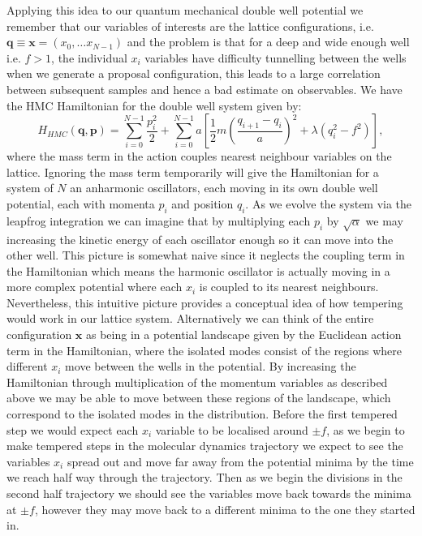 \documentclass[12pt]{article}
\begin{document}
    Applying this idea to our quantum mechanical double well potential we remember that our variables of interests are the lattice configurations, i.e. $\bm{q}\equiv\bm{x}=\left(x_0,\dots x_{N-1}\right)$ and the problem is that for a deep and wide enough well i.e. $f>1$, the individual $x_i$ variables have difficulty tunnelling between the wells when we generate a proposal configuration, this leads to a large correlation between subsequent samples and hence a bad estimate on observables. We have the HMC Hamiltonian for the double well system given by:
    \begin{equation}
        H_{HMC}\left(\bm{q},\bm{p}\right) = \sum_{i=0}^{N-1}\frac{p_i^2}{2} + \sum_{i=0}^{N-1} a \left[\frac{1}{2}m\left(\frac{q_{i+1}-q_{i}}{a}\right)^2 + \lambda\left(q_i^2-f^2\right)\right],
    \end{equation}
    where the mass term in the action couples nearest neighbour variables on the lattice. Ignoring the mass term temporarily will give the Hamiltonian for a system of $N$ an anharmonic oscillators, each moving in its own double well potential, each with momenta $p_i$ and position $q_i$. As we evolve the system via the leapfrog integration we can imagine that by multiplying each $p_i$ by $\sqrt{\alpha}$ we may increasing the kinetic energy of each oscillator enough so it can move into the other well. This picture is somewhat naive since it neglects the coupling term in the Hamiltonian which means the harmonic oscillator is actually moving in a more complex potential where each $x_i$ is coupled to its nearest neighbours. Nevertheless, this intuitive picture provides a conceptual idea of how tempering would work in our lattice system. Alternatively we can think of the entire configuration $\bm{x}$ as being in a potential landscape given by the Euclidean action term in the Hamiltonian, where the isolated modes consist of the regions where different $x_i$ move between the wells in the potential. By increasing the Hamiltonian through multiplication of the momentum variables as described above we may be able to move between these regions of the landscape, which correspond to the isolated modes in the distribution. Before the first tempered step we would expect each $x_i$ variable to be localised around $\pm f$, as we begin to make tempered steps in the molecular dynamics trajectory we expect to see the variables $x_i$ spread out and move far away from the potential minima by the time we reach half way through the trajectory. Then as we begin the divisions in the second half trajectory we should see the variables move back towards the minima at $\pm f$, however they may move back to a different minima to the one they started in.
\end{document}
